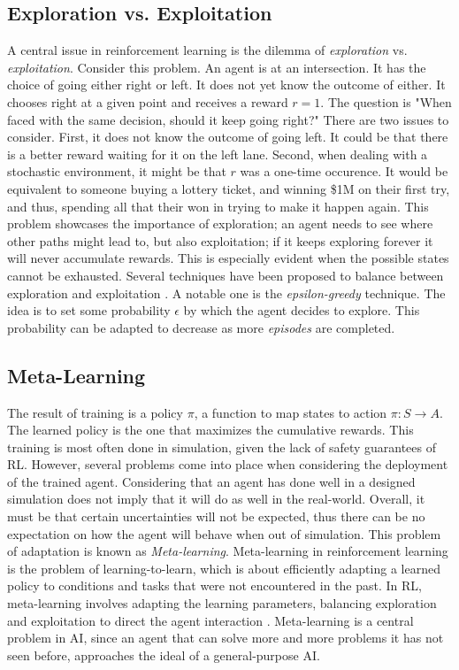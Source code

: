 \documentclass[a4paper,11pt]{article}
\begin{document}
\subsection{Exploration vs. Exploitation}
A central issue in reinforcement learning is the dilemma of \emph{exploration} vs. \emph{exploitation}. Consider this problem. An agent is at an intersection. It has the choice of going either right or left. 
It does not yet know the outcome of either. It chooses right at a given point and receives a reward $r=1$. The question is "When faced with the same decision, should it keep going right?" There are two issues to consider. 
First, it does not know the outcome of going left. It could be that there is a better reward waiting for it on the left lane. Second, when dealing with a stochastic environment, it might be that $r$ was a one-time occurence. 
It would be equivalent to someone buying a lottery ticket, and winning \$1M on their first try, and thus, spending all that their won in trying to make it happen again. This problem showcases the importance of exploration; an agent 
needs to see where other paths might lead to, but also exploitation; if it keeps exploring forever it will never accumulate rewards. This is especially evident when the possible states cannot be exhausted. Several techniques have been proposed 
to balance between exploration and exploitation \cite{Kaelbling1996ReinforcementLA}. A notable one is the \emph{epsilon-greedy} technique. The idea is to set some probability $\epsilon$ by which the agent decides to explore. This probability can be adapted 
to decrease as more \emph{episodes} are completed. 

\subsection{Meta-Learning}
The result of training is a policy $\pi$, a function to map states to action $\pi : S \rightarrow A$. The learned policy is the one that maximizes the cumulative rewards.
This training is most often done in simulation, given the lack of safety guarantees of RL. 
However, several problems come into place when considering the deployment of the trained agent. Considering that an agent has done well in 
a designed simulation does not imply that it will do as well in the real-world. Overall, it must be that certain uncertainties will not be expected, thus there can be no expectation on how the agent will behave 
when out of simulation. This problem of adaptation is known as \emph{Meta-learning}. Meta-learning in reinforcement learning is the problem of learning-to-learn, which is about efficiently
adapting a learned policy to conditions and tasks that were not encountered in the past. In RL, meta-learning
involves adapting the learning parameters, balancing exploration and exploitation to direct the
agent interaction \cite{gupta_meta-reinforcement_2018,schweighofer_meta-learning_2003}. Meta-learning is a central problem in AI, since an agent that can solve more
and more problems it has not seen before, approaches the ideal of a general-purpose AI. 
\end{document}
